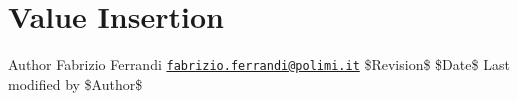 \hypertarget{group__Storage}{}\section{Value Insertion}
\label{group__Storage}
\begin{DoxyAuthor}{Author}
Fabrizio Ferrandi \href{mailto:fabrizio.ferrandi@polimi.it}{\tt fabrizio.\+ferrandi@polimi.\+it} \$\+Revision\$ \$\+Date\$ Last modified by \$\+Author\$ 
\end{DoxyAuthor}
